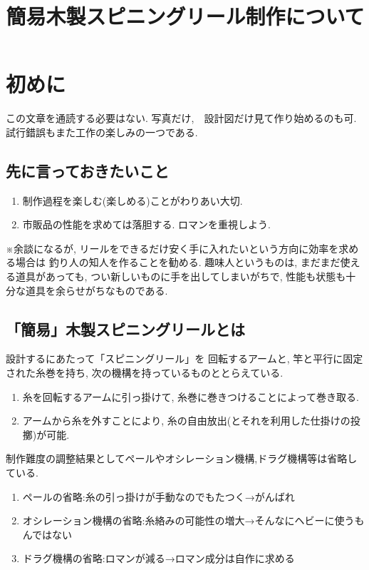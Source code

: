 \documentclass{jarticle}
\title{簡易木製スピニングリール制作について}
\begin{document}
\maketitle

\section{初めに}
この文章を通読する必要はない.
写真だけ,　設計図だけ見て作り始めるのも可.
試行錯誤もまた工作の楽しみの一つである.

\subsection{先に言っておきたいこと}
\begin{enumerate}
\item 制作過程を楽しむ(楽しめる)ことがわりあい大切.
\item 市販品の性能を求めては落胆する. ロマンを重視しよう.
\end{enumerate}

※余談になるが, 
リールをできるだけ安く手に入れたいという方向に効率を求める場合は
釣り人の知人を作ることを勧める.
趣味人というものは, まだまだ使える道具があっても, つい新しいものに手を出してしまいがちで,
性能も状態も十分な道具を余らせがちなものである.

\subsection{「簡易」木製スピニングリールとは}
設計するにあたって「スピニングリール」を
	回転するアームと, 竿と平行に固定された糸巻を持ち,
	次の機構を持っているものととらえている.
	\begin{enumerate}
	\item
		糸を回転するアームに引っ掛けて, 糸巻に巻きつけることによって巻き取る.
	\item 
		アームから糸を外すことにより, 糸の自由放出(とそれを利用した仕掛けの投擲)が可能.
	\end{enumerate}
	制作難度の調整結果としてペールやオシレーション機構,ドラグ機構等は省略している.
	\begin{enumerate}
	\item
		ペールの省略:糸の引っ掛けが手動なのでもたつく→がんばれ
	\item 
		オシレーション機構の省略:糸絡みの可能性の増大→そんなにヘビーに使うもんではない
	\item 
		ドラグ機構の省略:ロマンが減る→ロマン成分は自作に求める
	\end{enumerate}
\end{document}
